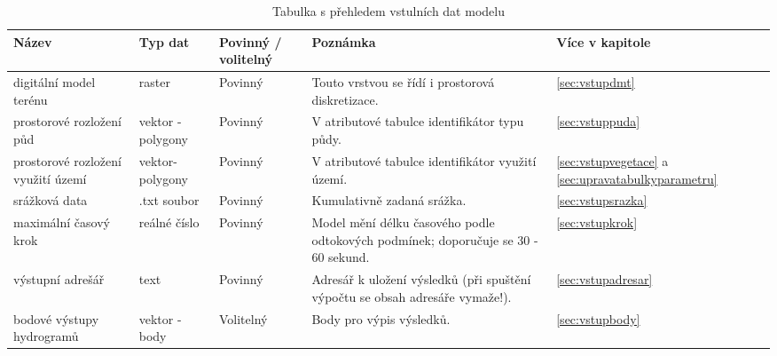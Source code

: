 
% 
\begin{sidewaystable}
\centering
\caption{Tabulka s přehledem vstulních dat modelu}
\label{tab:vstupy}
\small{
\begin{tabular}{p{}lp{}p{}l}
\hline
Název                              & Typ dat                       & Povinný / volitelný & Poznámka                                                                                      & Více v kapitole                                                 \\ \hline \hline
digitální model terénu             & raster                        & Povinný           & Touto vrstvou se řídí i prostorová diskretizace.                                                 & \ref{sec:vstupdmt}                                           \\ 
prostorové rozložení půd           & vektor - polygony             & Povinný           & V atributové tabulce identifikátor typu půdy.                                               & \ref{sec:vstuppuda}                                          \\ 
prostorové rozložení využití území & vektor- polygony              & Povinný           & V atributové tabulce identifikátor využití území.                                           & \ref{sec:vstupvegetace} a \ref{sec:upravatabulkyparametru}   \\ 
srážková data                      & .txt soubor                   & Povinný           & Kumulativně zadaná srážka.                                                                       & \ref{sec:vstupsrazka}                                        \\ 
maximální časový krok              & reálné číslo                  & Povinný           & Model mění délku časového podle odtokových podmínek; doporučuje se 30 - 60 sekund.               & \ref{sec:vstupkrok}                                          \\ 
výstupní adrešář                   & text                          & Povinný           & Adresář k uložení výsledků (při spuštění výpočtu se obsah adresáře vymaže!).                            & \ref{sec:vstupadresar}                                       \\ 
bodové výstupy hydrogramů          & vektor - body                 & Volitelný         & Body pro výpis výsledků.                                                                   & \ref{sec:vstupbody}                                          \\ 

\end{tabular}}
\end{sidewaystable}
